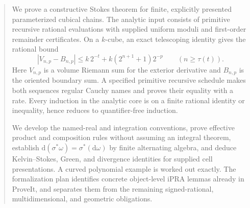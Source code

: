 \documentclass[11pt,letterpaper]{article}
\theoremstyle{definition}
\theoremstyle{remark}
\newcommand{\abs}[1]{\left|#1\right|}
\newcommand{\dd}{\mathrm d}
\begin{document}
\begin{abstract}
We prove a constructive Stokes theorem for finite, explicitly presented
parameterized cubical chains. The analytic input consists of primitive recursive
rational evaluations with supplied uniform moduli and first-order remainder
certificates. On a $k$-cube, an exact telescoping identity gives the rational bound
\[
 \abs{V_{n,p}-B_{n,p}}
 \le k\,2^{-t}+k(2^{n+1}+1)2^{-p}
 \qquad(n\ge\tau(t)).
\]
Here $V_{n,p}$ is a volume Riemann sum for the exterior derivative and $B_{n,p}$
is the oriented boundary sum. A specified primitive recursive schedule makes
both sequences regular Cauchy names and proves their equality with a rate.
Every induction in the analytic core is on a finite rational identity or
inequality, hence reduces to quantifier-free induction.

We develop the named-real and integration conventions, prove effective product
and composition rules without assuming an integral theorem, establish
$\dd(\sigma^*\omega)=\sigma^*(\dd\omega)$ by finite alternating algebra, and
deduce Kelvin--Stokes, Green, and divergence identities for supplied cell
presentations. A curved polynomial example is worked out exactly. The
formalization plan identifies concrete object-level iPRA lemmas already in
ProveIt, and separates them from the remaining signed-rational, multidimensional,
and geometric obligations.
\end{abstract}
\tableofcontents
\newpage








\end{document}
